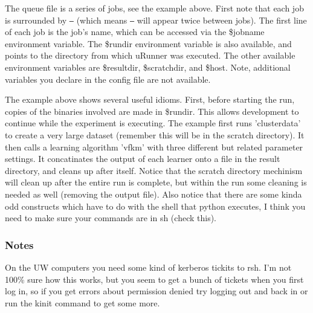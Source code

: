 The queue file is a series of jobs, see the example above. First note that each job is surrounded by {\tt ---} (which means {\tt ---} will appear twice between jobs). The first line of each job is the job's name, which can be accessed via the \$jobname environment variable. The \$rundir environment variable is also available, and points to the directory from which u\-Runner was executed. The other available environment variables are \$resultdir, \$scratchdir, and \$host. Note, additional variables you declare in the config file are not available.

The example above shows several useful idioms. First, before starting the run, copies of the binaries involved are made in \$rundir. This allows development to continue while the experiment is executing. The example first runs 'clusterdata' to create a very large dataset (remember this will be in the scratch directory). It then calls a learning algorithm 'vfkm' with three different but related parameter settings. It concatinates the output of each learner onto a file in the result directory, and cleans up after itself. Notice that the scratch directory mechinism will clean up after the entire run is complete, but within the run some cleaning is needed as well (removing the output file). Also notice that there are some kinda odd constructs which have to do with the shell that python executes, I think you need to make sure your commands are in sh (check this).

\subsubsection*{Notes}

On the UW computers you need some kind of kerberos tickits to rsh. I'm not 100\% sure how this works, but you seem to get a bunch of tickets when you first log in, so if you get errors about permission denied try logging out and back in or run the kinit command to get some more.

